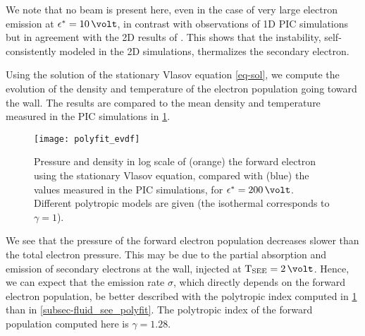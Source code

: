 We note that no beam is present here, even in the case of very large electron emission at $\crover=10\,\volt$, in contrast with observations of \ac{1D} PIC simulations \citep{sydorenko2006b,sydorenko2007} but in agreement with the \ac{2D} results of \citet{heron2013}.
This shows that the instability, self-consistently modeled in the \ac{2D} simulations, thermalizes the secondary electron.

Using the solution of the stationary Vlasov equation \cref{eq-sol}, we compute the evolution of the density and temperature of the electron population going toward the wall.
The results are compared to the mean density and temperature measured in the \ac{PIC} simulations in \cref{fig-evdf_polyfit}.

\begin{figure}[hbtp]
  \centering
  \texttt{[image: polyfit\_evdf]}
  \caption{Pressure and density in log scale of (orange) the forward electron using the stationary Vlasov equation, compared with (blue) the values measured in the \ac{PIC} simulations, for $\crover=200\,\volt$. Different polytropic models are given (the isothermal corresponds to $\gamma=1$).}
  \label{fig-evdf_polyfit}
\end{figure}

We see that the pressure of the forward electron population decreases slower than the total electron pressure.
This may be due to the partial absorption and emission of secondary electrons at the wall, injected at $\Tsee=2\,\volt$.
Hence, we can expect that the emission rate $\sigma$, which directly depends on the forward electron population, be better described with the polytropic index computed in \cref{fig-evdf_polyfit} than in \cref{subsec-fluid_see_polyfit}.
The polytropic index of the forward population computed here is $\gamma=1.28$.

